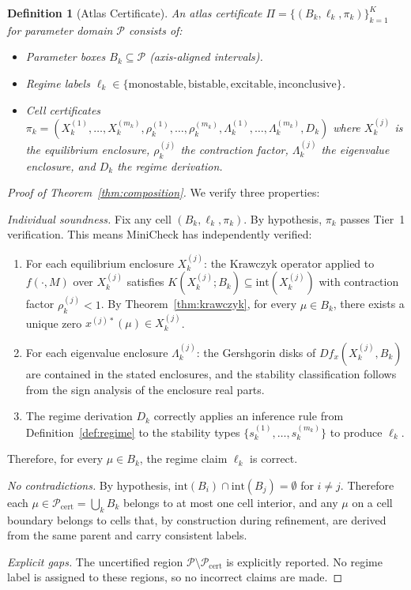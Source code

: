 \documentclass[11pt]{article}
\newtheorem{definition}[theorem]{Definition}
\begin{document}
\begin{definition}[Atlas Certificate]
An atlas certificate $\Pi = \{(B_k, \ell_k, \pi_k)\}_{k=1}^K$ for parameter domain $\mathcal{P}$ consists of:
\begin{itemize}
\item Parameter boxes $B_k \subseteq \mathcal{P}$ (axis-aligned intervals).
\item Regime labels $\ell_k \in \{\text{monostable}, \text{bistable}, \text{excitable}, \text{inconclusive}\}$.
\item Cell certificates $\pi_k = (X_k^{(1)}, \ldots, X_k^{(m_k)}, \rho_k^{(1)}, \ldots, \rho_k^{(m_k)}, \Lambda_k^{(1)}, \ldots, \Lambda_k^{(m_k)}, D_k)$ where $X_k^{(j)}$ is the equilibrium enclosure, $\rho_k^{(j)}$ the contraction factor, $\Lambda_k^{(j)}$ the eigenvalue enclosure, and $D_k$ the regime derivation.
\end{itemize}
\end{definition}

\begin{proof}[Proof of Theorem~\ref{thm:composition}]
We verify three properties:

\emph{Individual soundness.}
Fix any cell $(B_k, \ell_k, \pi_k)$.
By hypothesis, $\pi_k$ passes Tier~1 verification.
This means MiniCheck has independently verified:
\begin{enumerate}[label=(\alph*)]
\item For each equilibrium enclosure $X_k^{(j)}$: the Krawczyk operator applied to $f(\cdot, M)$ over $X_k^{(j)}$ satisfies $K(X_k^{(j)}; B_k) \subseteq \mathrm{int}(X_k^{(j)})$ with contraction factor $\rho_k^{(j)} < 1$.
By Theorem~\ref{thm:krawczyk}, for every $\mu \in B_k$, there exists a unique zero $x^{(j)*}(\mu) \in X_k^{(j)}$.

\item For each eigenvalue enclosure $\Lambda_k^{(j)}$: the Gershgorin disks of $Df_x(X_k^{(j)}, B_k)$ are contained in the stated enclosures, and the stability classification follows from the sign analysis of the enclosure real parts.

\item The regime derivation $D_k$ correctly applies an inference rule from Definition~\ref{def:regime} to the stability types $\{s_k^{(1)}, \ldots, s_k^{(m_k)}\}$ to produce $\ell_k$.
\end{enumerate}
Therefore, for every $\mu \in B_k$, the regime claim $\ell_k$ is correct.

\emph{No contradictions.}
By hypothesis, $\mathrm{int}(B_i) \cap \mathrm{int}(B_j) = \emptyset$ for $i \neq j$.
Therefore each $\mu \in \mathcal{P}_{\mathrm{cert}} = \bigcup_k B_k$ belongs to at most one cell interior, and any $\mu$ on a cell boundary belongs to cells that, by construction during refinement, are derived from the same parent and carry consistent labels.

\emph{Explicit gaps.}
The uncertified region $\mathcal{P} \setminus \mathcal{P}_{\mathrm{cert}}$ is explicitly reported.
No regime label is assigned to these regions, so no incorrect claims are made.
\end{proof}
\end{document}
